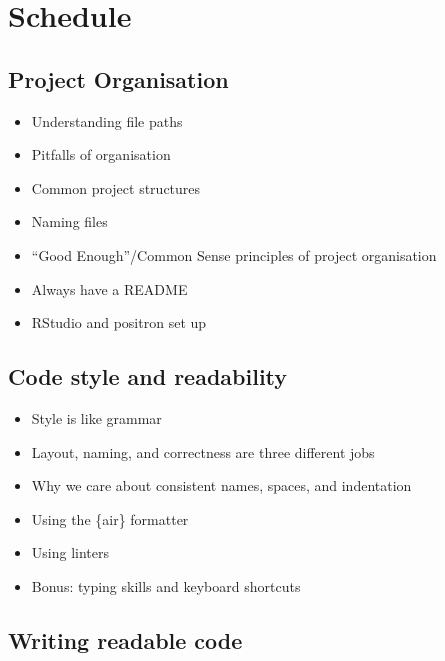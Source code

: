 \documentclass[
  letterpaper,
  justified,
  a4paper]{tufte-book}
\providecommand{\tightlist}{%
  \setlength{\itemsep}{0pt}\setlength{\parskip}{0pt}}
\providecommand{\tightlist}{%
  \setlength{\itemsep}{0pt}\setlength{\parskip}{0pt}}
\begin{document}

\chapter*{Schedule}\label{schedule}


\section*{Project Organisation}\label{project-organisation}


\begin{itemize}
\tightlist
\item
  Understanding file paths
\item
  Pitfalls of organisation
\item
  Common project structures
\item
  Naming files
\item
  ``Good Enough''/Common Sense principles of project organisation
\item
  Always have a README
\item
  RStudio and positron set up
\end{itemize}

\section*{Code style and readability}\label{code-style-and-readability}


\begin{itemize}
\tightlist
\item
  Style is like grammar
\item
  Layout, naming, and correctness are three different jobs
\item
  Why we care about consistent names, spaces, and indentation
\item
  Using the \{air\} formatter
\item
  Using linters
\item
  Bonus: typing skills and keyboard shortcuts
\end{itemize}

\section*{Writing readable code}\label{writing-readable-code}
\end{document}

